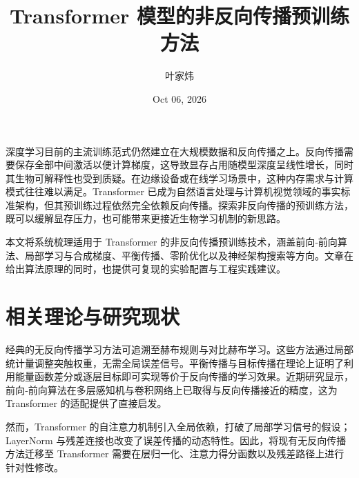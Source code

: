 \title{Transformer 模型的非反向传播预训练方法}
\author{叶家炜}
\date{Oct 06, 2026}
\maketitle
深度学习目前的主流训练范式仍然建立在大规模数据和反向传播之上。反向传播需要保存全部中间激活以便计算梯度，这导致显存占用随模型深度呈线性增长，同时其生物可解释性也受到质疑。在边缘设备或在线学习场景中，这种内存需求与计算模式往往难以满足。Transformer 已成为自然语言处理与计算机视觉领域的事实标准架构，但其预训练过程依然完全依赖反向传播。探索非反向传播的预训练方法，既可以缓解显存压力，也可能带来更接近生物学习机制的新思路。\par
本文将系统梳理适用于 Transformer 的非反向传播预训练技术，涵盖前向‐前向算法、局部学习与合成梯度、平衡传播、零阶优化以及神经架构搜索等方向。文章在给出算法原理的同时，也提供可复现的实验配置与工程实践建议。\par
\chapter{相关理论与研究现状}
经典的无反向传播学习方法可追溯至赫布规则与对比赫布学习。这些方法通过局部统计量调整突触权重，无需全局误差信号。平衡传播与目标传播在理论上证明了利用能量函数差分或逐层目标即可实现等价于反向传播的学习效果。近期研究显示，前向‐前向算法在多层感知机与卷积网络上已取得与反向传播接近的精度，这为 Transformer 的适配提供了直接启发。\par
然而，Transformer 的自注意力机制引入全局依赖，打破了局部学习信号的假设；LayerNorm 与残差连接也改变了误差传播的动态特性。因此，将现有无反向传播方法迁移至 Transformer 需要在层归一化、注意力得分函数以及残差路径上进行针对性修改。\par

